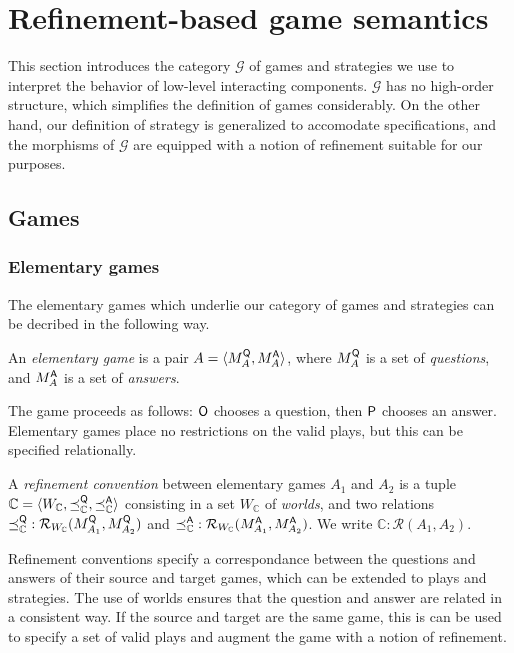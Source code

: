 \section{Refinement-based game semantics}

This section introduces the category $\mathcal{G}$ of games and strategies
we use to interpret the behavior of low-level interacting components.
$\mathcal{G}$ has no high-order structure,
which simplifies the definition of games considerably.
On the other hand,
our definition of strategy is generalized to accomodate specifications,
and the morphisms of $\mathcal{G}$ are equipped with a notion of refinement
suitable for our purposes.

\subsection{Games}

\subsubsection{Elementary games}

The elementary games which underlie
our category of games and strategies
can be decribed in the following way.

\begin{definition}
An \emph{elementary game} is a pair
$A = \langle M_A^{ \mathsf{Q} }, M_A^{ \mathsf{A} } \rangle$, where
$M_A^{ \mathsf{Q} }$ is a set of \emph{questions}, and
$M_A^{ \mathsf{A} }$ is a set of \emph{answers}.
\end{definition}

The game proceeds as follows:
$ \mathsf{O} $ chooses a question, then
$ \mathsf{P} $ chooses an answer.
Elementary games place no restrictions
on the valid plays,
but this can be specified relationally.

\begin{definition}
A \emph{refinement convention} between elementary games $A_1$ and $A_2$
is a tuple
$\mathbb{C} = \langle W_\mathbb{C}, \preceq_\mathbb{C}^{ \mathsf{Q} }, \preceq_\mathbb{C}^{ \mathsf{A} } \rangle$
consisting in a set $W_\mathbb{C}$ of \emph{worlds},
and two relations
${\preceq}_\mathbb{C}^{ \mathsf{Q} } : \mathcal{R}_{W_\mathbb{C}}(M_{A_1}^{ \mathsf{Q} },M_{A_2}^{ \mathsf{Q} })$ and
${\preceq}_\mathbb{C}^{ \mathsf{A} } : \mathcal{R}_{W_\mathbb{C}}(M_{A_1}^{ \mathsf{A} },M_{A_2}^{ \mathsf{A} })$.
We write $\mathbb{C} : \mathcal{R}(A_1, A_2)$.
\end{definition}

Refinement conventions specify a correspondance
between the questions and answers of their source and target games,
which can be extended to plays and strategies.
The use of worlds ensures that the question and answer
are related in a consistent way.
If the source and target are the same game,
this is can be used to specify a set of valid plays
and augment the game with a notion of refinement.

